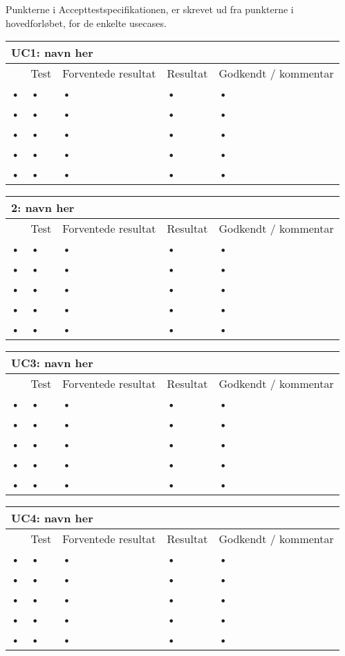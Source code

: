 
Punkterne i Accepttestspecifikationen, er skrevet ud fra punkterne i hovedforløbet, for de
enkelte usecases. 

\begin{tabular}{|l|l|l|l|l|}
\hline 
\multicolumn{5}{|l|}{\textbf{UC1: navn her}} \\ 
\hline 
& Test & Forventede resultat & Resultat & Godkendt / kommentar \\ 
\hline 
• & • & • & • & • \\ 
\hline 
• & • & • & • & • \\ 
\hline 
• & • & • & • & • \\ 
\hline 
• & • & • & • & • \\ 
\hline 
• & • & • & • & • \\ 
\hline 
\end{tabular} 

\begin{tabular}{|l|l|l|l|l|}
\hline 
\multicolumn{5}{|l|}{\textbf{2: navn her}} \\ 
\hline 
& Test & Forventede resultat & Resultat & Godkendt / kommentar \\ 
\hline 
• & • & • & • & • \\ 
\hline 
• & • & • & • & • \\ 
\hline 
• & • & • & • & • \\ 
\hline 
• & • & • & • & • \\ 
\hline 
• & • & • & • & • \\ 
\hline 
\end{tabular} 

\begin{tabular}{|l|l|l|l|l|}
\hline 
\multicolumn{5}{|l|}{\textbf{UC3: navn her}} \\ 
\hline 
& Test & Forventede resultat & Resultat & Godkendt / kommentar \\ 
\hline 
• & • & • & • & • \\ 
\hline 
• & • & • & • & • \\ 
\hline 
• & • & • & • & • \\ 
\hline 
• & • & • & • & • \\ 
\hline 
• & • & • & • & • \\ 
\hline 
\end{tabular} 

\begin{tabular}{|l|l|l|l|l|}
\hline 
\multicolumn{5}{|l|}{\textbf{UC4: navn her}} \\ 
\hline 
& Test & Forventede resultat & Resultat & Godkendt / kommentar \\ 
\hline 
• & • & • & • & • \\ 
\hline 
• & • & • & • & • \\ 
\hline 
• & • & • & • & • \\ 
\hline 
• & • & • & • & • \\ 
\hline 
• & • & • & • & • \\ 
\hline 
\end{tabular} 

